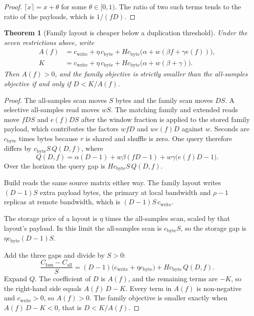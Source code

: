 \documentclass[11pt]{article}
\newtheorem{theorem}{Theorem}
\begin{document}
\begin{proof}
\(\lceil x \rceil = x + \theta\) for some \(\theta \in [0,1)\).
The ratio of two such terms tends to the ratio of the payloads, which is \(1/(f D)\).
\end{proof}

\begin{theorem}[Family layout is cheaper below a duplication threshold]
\label{thm:gap}
Under the seven restrictions above, write
\begin{align}
A(f) &= c_{\mathrm{write}} + \eta\, c_{\mathrm{byte}}
  + H c_{\mathrm{byte}} \bigl(\alpha + w(\beta f + \gamma e(f))\bigr), \\
K &= c_{\mathrm{write}} + \eta\, c_{\mathrm{byte}}
  + H c_{\mathrm{byte}} \bigl(\alpha + w(\beta + \gamma)\bigr).
\end{align}
Then \(A(f) > 0\), and the family objective is strictly smaller than the all-samples objective if and only if \(D < K / A(f)\).
\end{theorem}

\begin{proof}
The all-samples scan moves \(S\) bytes and the family scan moves \(D S\).
A selective all-samples read moves \(w S\).
The matching family and extended reads move \(f D S\) and \(e(f) D S\) after the window fraction is applied to the stored family payload, which contributes the factors \(w f D\) and \(w e(f) D\) against \(w\).
Seconds are \(c_{\mathrm{byte}}\) times bytes because \(r\) is shared and shuffle is zero.
One query therefore differs by \(c_{\mathrm{byte}} S\, Q(D,f)\), where
\[
Q(D,f) = \alpha(D-1) + w\beta(f D - 1) + w\gamma\bigl(e(f) D - 1\bigr).
\]
Over the horizon the query gap is \(H c_{\mathrm{byte}} S\, Q(D,f)\).

Build reads the same source matrix either way.
The family layout writes \((D-1)S\) extra payload bytes, the primary at local bandwidth and \(\rho-1\) replicas at remote bandwidth, which is \((D-1) S\, c_{\mathrm{write}}\).

The storage price of a layout is \(\eta\) times the all-samples scan, scaled by that layout's payload.
In this limit the all-samples scan is \(c_{\mathrm{byte}} S\), so the storage gap is \(\eta c_{\mathrm{byte}} (D-1) S\).

Add the three gaps and divide by \(S > 0\):
\begin{equation}
\frac{C_{\mathrm{fam}} - C_{\mathrm{all}}}{S}
  = (D-1)\bigl(c_{\mathrm{write}} + \eta c_{\mathrm{byte}}\bigr) + H c_{\mathrm{byte}}\, Q(D,f).
\label{eq:gap}
\end{equation}
Expand \(Q\).
The coefficient of \(D\) is \(A(f)\), and the remaining terms are \(-K\), so the right-hand side equals \(A(f)\, D - K\).
Every term in \(A(f)\) is non-negative and \(c_{\mathrm{write}} > 0\), so \(A(f) > 0\).
The family objective is smaller exactly when \(A(f)\, D - K < 0\), that is \(D < K/A(f)\).
\end{proof}
\end{document}
